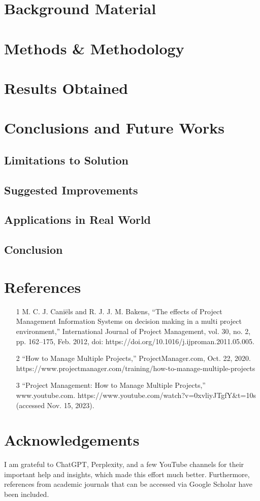 \documentclass{llncs}
\begin{document}
\section{Background Material}

\section{Methods \& Methodology}

\section{Results Obtained}

\section{Conclusions and Future Works}

\subsection{Limitations to Solution}

\subsection{Suggested Improvements}

\subsection{Applications in Real World}

\subsection{Conclusion}


\section{References}
\begin{enumerate}
  \item [1]M. C. J. Caniëls and R. J. J. M. Bakens, “The effects of Project Management Information Systems on decision making in a multi project environment,” International Journal of Project Management, vol. 30, no. 2, pp. 162–175, Feb. 2012, doi: https://doi.org/10.1016/j.ijproman.2011.05.005.
‌
‌
  \item [2]“How to Manage Multiple Projects,” ProjectManager.com, Oct. 22, 2020. https://www.projectmanager.com/training/how-to-manage-multiple-projects
  \item [3]“Project Management: How to Manage Multiple Projects,” www.youtube.com. https://www.youtube.com/watch?v=0xvliyJTgfY&t=10s (accessed Nov. 15, 2023).
\end{enumerate}


\section{Acknowledgements}
I am grateful to ChatGPT, Perplexity, and a few YouTube channels for their important help and insights, which made this effort much better. Furthermore, references from academic journals that can be accessed via Google Scholar have been included.
\end{document}
